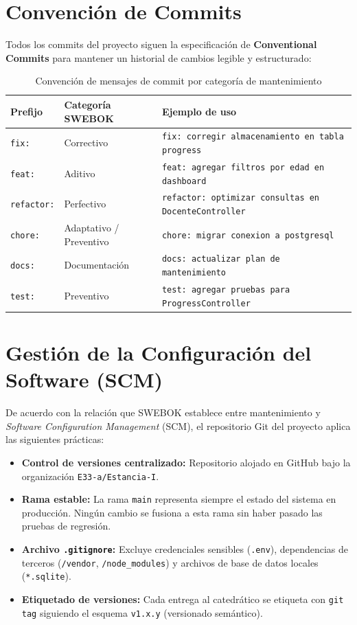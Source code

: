 \section{Convención de Commits}

Todos los commits del proyecto siguen la especificación de \textbf{Conventional Commits}
para mantener un historial de cambios legible y estructurado:

\begin{table}[H]
\centering
\begin{tabular}{lll}
\toprule
\textbf{Prefijo} & \textbf{Categoría SWEBOK} & \textbf{Ejemplo de uso} \\
\midrule
\texttt{fix:}      & Correctivo  & \texttt{fix: corregir almacenamiento en tabla progress} \\
\texttt{feat:}     & Aditivo     & \texttt{feat: agregar filtros por edad en dashboard} \\
\texttt{refactor:} & Perfectivo  & \texttt{refactor: optimizar consultas en DocenteController} \\
\texttt{chore:}    & Adaptativo / Preventivo & \texttt{chore: migrar conexion a postgresql} \\
\texttt{docs:}     & Documentación & \texttt{docs: actualizar plan de mantenimiento} \\
\texttt{test:}     & Preventivo  & \texttt{test: agregar pruebas para ProgressController} \\
\bottomrule
\end{tabular}
\caption{Convención de mensajes de commit por categoría de mantenimiento}
\label{tab:commits}
\end{table}

\newpage
\section{Gestión de la Configuración del Software (SCM)}

De acuerdo con la relación que SWEBOK establece entre mantenimiento y
\textit{Software Configuration Management} (SCM), el repositorio Git del proyecto
aplica las siguientes prácticas:

\begin{itemize}
    \item \textbf{Control de versiones centralizado:} Repositorio alojado en GitHub
          bajo la organización \texttt{E33-a/Estancia-I}.
    \item \textbf{Rama estable:} La rama \texttt{main} representa siempre el estado
          del sistema en producción. Ningún cambio se fusiona a esta rama sin haber
          pasado las pruebas de regresión.
    \item \textbf{Archivo \texttt{.gitignore}:} Excluye credenciales sensibles
          (\texttt{.env}), dependencias de terceros (\texttt{/vendor},
          \texttt{/node\_modules}) y archivos de base de datos locales
          (\texttt{*.sqlite}).
    \item \textbf{Etiquetado de versiones:} Cada entrega al catedrático se etiqueta
          con \texttt{git tag} siguiendo el esquema \texttt{v1.x.y} (versionado
          semántico).
\end{itemize}
